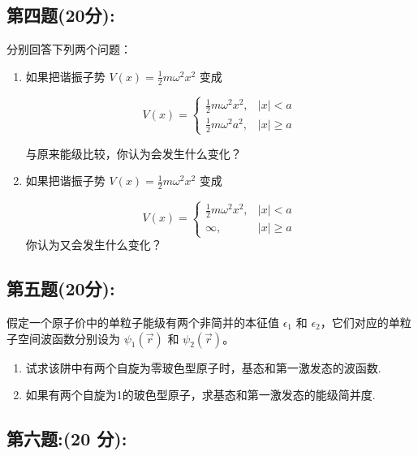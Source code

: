 \subsection{第四题(20分):}
分别回答下列两个问题：

\begin{enumerate}
    \item  如果把谐振子势 $V(x) = \frac{1}{2} m \omega^2 x^2$ 变成

    \[
    V(x) =
    \begin{cases}
    \frac{1}{2} m \omega^2 x^2, & |x| < a \\
    \frac{1}{2} m \omega^2 a^2, & |x| \geq a
    \end{cases}~
    \]

    与原来能级比较，你认为会发生什么变化？

    \item  如果把谐振子势 $V(x) = \frac{1}{2} m \omega^2 x^2$ 变成

    \[
    V(x) =
    \begin{cases}
    \frac{1}{2} m \omega^2 x^2, & |x| < a \\
    \infty, & |x| \geq a
    \end{cases}~
    \]
    你认为又会发生什么变化？
\end{enumerate}
\subsection{第五题(20分):}
假定一个原子价中的单粒子能级有两个非简并的本征值 $\epsilon_1$ 和 $\epsilon_2$，它们对应的单粒子空间波函数分别设为 $\psi_1(\vec r)$ 和 $\psi_2(\vec r)$。

\begin{enumerate}
    \item  试求该阱中有两个自旋为零玻色型原子时，基态和第一激发态的波函数.
    \item  如果有两个自旋为1的玻色型原子，求基态和第一激发态的能级简并度.
\end{enumerate}
\subsection{第六题:(20 分):}
